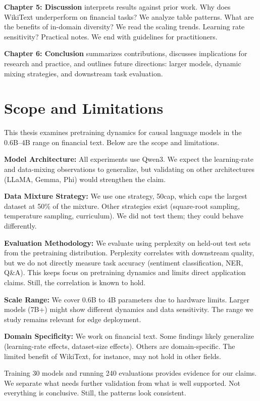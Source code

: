 \textbf{Chapter 5: Discussion} interprets results against prior work. Why does WikiText underperform on financial tasks? We analyze table patterns. What are the benefits of in-domain diversity? We read the scaling trends. Learning rate sensitivity? Practical notes. We end with guidelines for practitioners.

\textbf{Chapter 6: Conclusion} summarizes contributions, discusses implications for research and practice, and outlines future directions: larger models, dynamic mixing strategies, and downstream task evaluation.

\section{Scope and Limitations}

This thesis examines pretraining dynamics for causal language models in the 0.6B--4B range on financial text. Below are the scope and limitations.

\textbf{Model Architecture:} All experiments use Qwen3. We expect the learning-rate and data-mixing observations to generalize, but validating on other architectures (LLaMA, Gemma, Phi) would strengthen the claim.

\textbf{Data Mixture Strategy:} We use one strategy, 50cap, which caps the largest dataset at 50\% of the mixture. Other strategies exist (square-root sampling, temperature sampling, curriculum). We did not test them; they could behave differently.

\textbf{Evaluation Methodology:} We evaluate using perplexity on held-out test sets from the pretraining distribution. Perplexity correlates with downstream quality, but we do not directly measure task accuracy (sentiment classification, NER, Q\&A). This keeps focus on pretraining dynamics and limits direct application claims. Still, the correlation is known to hold.

\textbf{Scale Range:} We cover 0.6B to 4B parameters due to hardware limits. Larger models (7B+) might show different dynamics and data sensitivity. The range we study remains relevant for edge deployment.

\textbf{Domain Specificity:} We work on financial text. Some findings likely generalize (learning-rate effects, dataset-size effects). Others are domain-specific. The limited benefit of WikiText, for instance, may not hold in other fields.

Training 30 models and running 240 evaluations provides evidence for our claims. We separate what needs further validation from what is well supported. Not everything is conclusive. Still, the patterns look consistent.
